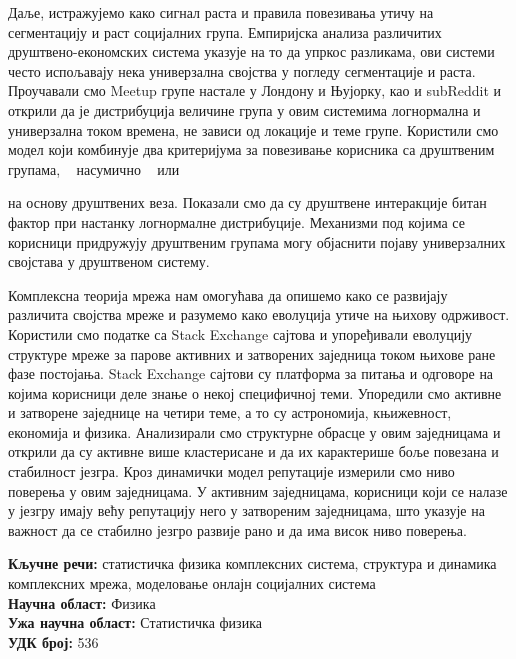 Даље, истражујемо како сигнал раста и правила повезивања утичу на сегментацију и раст социјалних група. Емпиријска анализа различитих друштвено-економских система указује на то да упркос разликама, ови системи често испољавају нека универзална својства у погледу сегментације и раста. Проучавали смо {Meetup} групе настале у Лондону и Њујорку, као и {subReddit} и открили да је дистрибуција величине група у овим системима логнормална и универзална током времена, не зависи од локације и теме групе. Користили смо модел који комбинује два критеријума за повезивање корисника са друштвеним групама, ~ насумично ~ или

\newpage
{} 

\noindent  на  основу друштвених веза. Показали смо да су друштвене интеракције битан фактор при настанку логнормалне дистрибуције. Механизми под којима се корисници придружују друштвеним групама могу објаснити појаву универзалних својстава у друштвеном систему.

Комплексна теорија мрежа нам омогућава да опишемо како се развијају различита својства мреже и разумемо како еволуција утиче на њихову одрживост. Користили смо податке са {Stack Exchange} сајтова и упоређивали еволуцију структуре мреже за парове активних и затворених заједница током њихове ране фазе постојања. {Stack Exchange} сајтови су платформа за питања и одговоре на којима корисници деле знање о некој специфичној теми. Упоредили смо активне и затворене заједнице на четири теме, а то су астрономија, књижевност, економија и физика. Анализирали смо структурне обрасце у овим заједницама и открили да су активне више кластерисане и да их карактерише боље повезана и стабилност језгра. 
Кроз динамички модел репутације измерили смо ниво поверења у овим заједницама. У активним заједницама, корисници који се налазе у језгру имају већу репутацију него у затвореним заједницама, што указује на важност да се стабилно језгро развије рано и да има висок ниво поверења.

\noindent
\textbf{Кључне речи:} статистичка физика комплексних система, структура и динамика комплексних мрежа, моделовање онлајн социјалних система \\
\textbf{Научна област:} Физика \\
\textbf{Ужа научна област:} Статистичка физика \\
\textbf{УДК број:} 536 %
